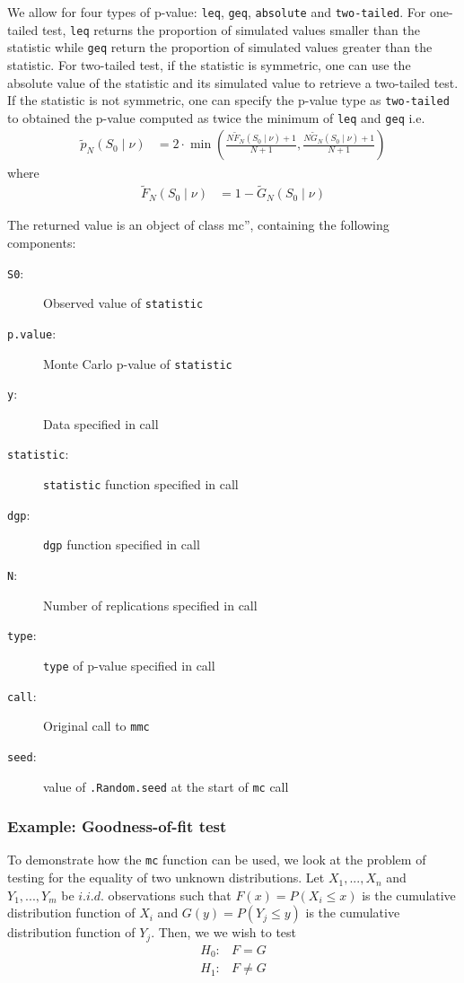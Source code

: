 \documentclass[]{article}\usepackage[]{graphicx}\usepackage[]{color}
\let\code=\texttt
\begin{document}
	We allow for four types of p-value: \code{leq}, \code{geq}, \code{absolute} and
	\code{two-tailed}. For one-tailed test, \code{leq} returns the proportion of simulated values smaller than the statistic while \code{geq} return the proportion of simulated values greater than the statistic. For two-tailed test, if the statistic is symmetric, one can use the	absolute value of the statistic and its simulated value to retrieve a two-tailed test. If the statistic is not symmetric, one can specify the p-value type as \code{two-tailed} to obtained the p-value computed as twice the minimum of \code{leq} and \code{geq} i.e.
	\begin{align}
	\tilde{p}_{N}(S_{0} \mid \nu) & = 2 \cdot \min \left(  \frac{N\tilde{F}_{N}(S_{0} \mid \nu)+1}{N+1},
	\frac{N\tilde{G}_{N}(S_{0} \mid \nu)+1}{N+1}
	\right)
	\end{align}
	where
	\begin{align}
	\tilde{F}_{N}(S_{0} \mid \nu) & = 1-\tilde{G}_{N}(S_{0} \mid \nu)
	\end{align}

	The returned value is an object of class mc'', containing the following components:
	\begin{description}
		\item[\code{S0}:] Observed value of \code{statistic}
		\item[\code{p.value}:] Monte Carlo p-value of \code{statistic}
		\item[\code{y}:] Data specified in call
		\item[\code{statistic}:] \code{statistic} function specified in call
		\item[\code{dgp}:] \code{dgp} function specified in call
		\item[\code{N}:] Number of replications specified in call
		\item[\code{type}:] \code{type} of p-value specified in call
		\item[\code{call}:] Original call to \code{mmc}
		\item[\code{seed}:] value of \code{.Random.seed} at the start of \code{mc} call
	\end{description}

	\subsubsection{Example: Goodness-of-fit test}

	To demonstrate how the \code{mc} function can be used, we look at the problem of testing for the equality of two unknown distributions. Let $X_1,...,X_n$  and  $Y_1,...,Y_m$ be $i.i.d.$ observations such that  $F(x)=P(X_i \leq x)$ is the cumulative distribution function of $X_i$ and $G(y)=P(Y_j \leq y)$ is the cumulative distribution function of $Y_j$. Then, we we wish to test
	\begin{align}
		H_0: & F = G \\
		H_1: & F \neq G
	\end{align}
\end{document}
